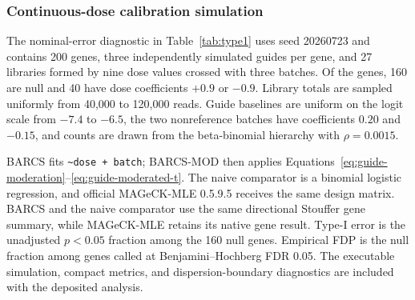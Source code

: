 \subsubsection{Continuous-dose calibration simulation}

The nominal-error diagnostic in Table~\ref{tab:type1} uses seed 20260723 and
contains 200 genes,
three independently simulated guides per gene, and 27 libraries formed by nine
dose values crossed with three batches.  Of the genes, 160 are null and 40
have dose coefficients $+0.9$ or $-0.9$.  Library totals are sampled uniformly
from 40,000 to 120,000 reads.  Guide baselines are uniform on the logit scale
from $-7.4$ to $-6.5$, the two nonreference batches have coefficients $0.20$
and $-0.15$, and counts are drawn from the beta-binomial hierarchy with
$\rho=0.0015$.

BARCS fits \texttt{\textasciitilde dose + batch}; BARCS-MOD then applies
Equations~\eqref{eq:guide-moderation}--\eqref{eq:guide-moderated-t}.  The
naive comparator is a binomial logistic regression, and official MAGeCK-MLE
0.5.9.5 receives the same design matrix.  BARCS and the naive comparator use
the same directional Stouffer gene summary, while MAGeCK-MLE retains its native
gene result.  Type-I error is the unadjusted $p<0.05$ fraction among the 160
null genes.  Empirical FDP is the null fraction among genes called at
Benjamini--Hochberg FDR 0.05.  The executable simulation, compact metrics, and
dispersion-boundary diagnostics are included with the deposited analysis.
